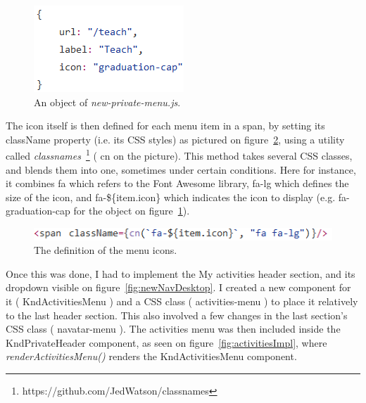 \begin{figure}[H]
    \centering
    \includegraphics[scale=0.9]{figure/icon.png}
    \caption{An object of \textit{new-private-menu.js}.}
    \label{fig:icon}
\end{figure}

The icon itself is then defined for each menu item in a span, by setting its className property (i.e. its CSS styles) as pictured on {\sc figure}~\ref{fig:classnames}, using a utility called \textit{classnames}~\footnote{https://github.com/JedWatson/classnames} (\guillemotleft{} cn \guillemotright{} on the picture). This method takes several CSS classes, and blends them into one, sometimes under certain conditions. Here for instance, it combines \guillemotleft{} fa \guillemotright{} which refers to the Font Awesome library, \guillemotleft{} fa-lg \guillemotright{} which defines the size of the icon, and \guillemotleft{} fa-\$\{item.icon\} \guillemotright{} which indicates the icon to display (e.g. \guillemotleft{} fa-graduation-cap \guillemotright{} for the object on {\sc figure}~\ref{fig:icon}). 

\begin{figure}[H]
    \centering
    \includegraphics[scale=0.9]{figure/classnames.png}
    \caption{The definition of the menu icons.}
    \label{fig:classnames}
\end{figure}

Once this was done, I had to implement the \guillemotleft{} My activities \guillemotright{} header section, and its dropdown visible on {\sc figure}~\ref{fig:newNavDesktop}. I created a new component for it (\guillemotleft{} KndActivitiesMenu \guillemotright{}) and a CSS class (\guillemotleft{} activities-menu \guillemotright{}) to place it relatively to the last header section. This also involved a few changes in the last section's CSS class (\guillemotleft{} navatar-menu \guillemotright{}). The activities menu was then included inside the \guillemotleft{} KndPrivateHeader \guillemotright{} component, as seen on {\sc figure}~\ref{fig:activitiesImpl}, where \textit{renderActivitiesMenu()} renders the \guillemotleft{} KndActivitiesMenu \guillemotright{} component.

